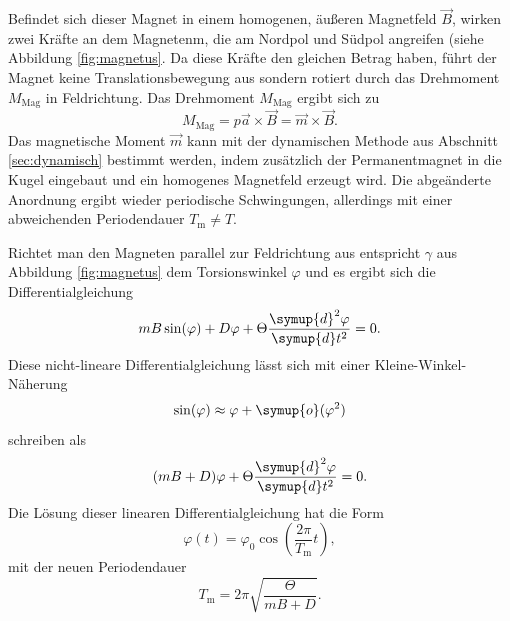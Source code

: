 Befindet sich dieser Magnet in einem homogenen, äußeren Magnetfeld $\vec{B}$, wirken zwei
Kräfte an dem Magnetenm, die am Nordpol und Südpol angreifen (siehe Abbildung \ref{fig:magnetus}.
Da diese Kräfte den gleichen Betrag haben, führt der Magnet keine Translationsbewegung aus
sondern rotiert durch das Drehmoment $M_{\mathrm{Mag}}$ in Feldrichtung.
Das Drehmoment $M_{\mathrm{Mag}}$ ergibt sich zu
\begin{equation}
	M_{\mathrm{Mag}} = p \vec{a} \times \vec{B} = \vec{m} \times \vec{B} \mathrm{.}
\end{equation}
Das magnetische Moment $\vec{m}$ kann mit der dynamischen Methode aus Abschnitt
\ref{sec:dynamisch} bestimmt werden, indem zusätzlich der Permanentmagnet in die Kugel eingebaut
und ein homogenes Magnetfeld erzeugt wird.
Die abgeänderte Anordnung ergibt wieder periodische Schwingungen, allerdings mit einer
abweichenden Periodendauer $T_{\mathrm{m}} \neq T$.

Richtet man den Magneten parallel zur Feldrichtung aus entspricht $\gamma$ aus Abbildung
\ref{fig:magnetus} dem Torsionswinkel $\varphi$ und es ergibt sich die Differentialgleichung
\begin{equation}
	m B \sin(\varphi)  + D \varphi + \Theta \frac{\symup{d}^2 \varphi}{\symup{d} t^2} = 0
	\mathrm{.}
\end{equation}
Diese nicht-lineare Differentialgleichung lässt sich mit einer Kleine-Winkel-Näherung
\begin{equation*}
	\sin(\varphi) \approx \varphi + \symup{o}(\varphi^2)
\end{equation*}
schreiben als
\begin{equation}
	\label{eqn:jkadsfl}
	(mB + D) \varphi + \Theta \frac{\symup{d}^2 \varphi}{\symup{d} t^2} = 0 \mathrm{.}
\end{equation}
Die Lösung dieser linearen Differentialgleichung hat die Form
\begin{equation}
	\varphi(t) = \varphi_0 \cos(\frac{2\pi}{T_{\mathrm{m}}} t) \mathrm{,}
\end{equation}
mit der neuen Periodendauer
\begin{equation}
	\label{eqn:periodemagnet}
	T_{\mathrm{m}} = 2\pi \sqrt{\frac{\Theta}{mB + D}} \mathrm{.}
\end{equation}
